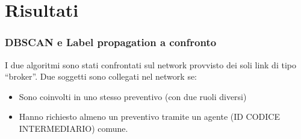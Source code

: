 \documentclass{beamer}
\begin{document}
\section{Risultati}
\frame{\sectionpage}
\begin{frame}
 \frametitle{DBSCAN e Label propagation a confronto}
 I due algoritmi sono stati confrontati sul network provvisto dei soli link di tipo ``broker''. Due soggetti sono collegati nel network se:
 
 \begin{itemize}
\item Sono coinvolti in uno stesso preventivo (con due ruoli diversi)
\item Hanno richiesto almeno un preventivo tramite un agente (ID CODICE INTERMEDIARIO) comune. 
 \end{itemize}
 \end{frame}
\end{document}
